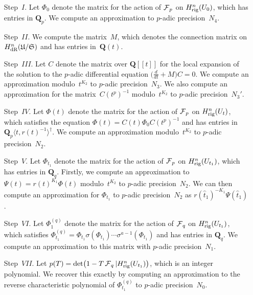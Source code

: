 \begin{enumerate}
\item[Step~$I$.]
Let $\Phi_0$ denote the matrix for the action of $\operatorname{\mathcal{F}}_p$ on 
$H_{\text{rig}}^{n}(U_0)$, which has entries in $\mathbf{Q}_p$.  
We compute an approximation to $p$-adic precision~$N_4$.
\item[Step~$II$.]
We compute the matrix~$M$, which denotes the connection matrix 
on $H_{\text{dR}}^{n}(\mathfrak{U}/\mathfrak{S})$ and has entries in~$\mathbf{Q}(t)$.
\item[Step~$III$.]
Let $C$ denote the matrix over $\mathbf{Q}[[t]]$ for the local 
expansion of the solution to the $p$-adic differential equation 
$\bigl(\tfrac{d}{dt} + M\bigr) C = 0$.  We compute an approximation 
modulo~$t^{K_2}$ to $p$-adic precision~$N_3$.  We also compute an 
approximation for the matrix~$C(t^p)^{-1}$ modulo~$t^{K_2}$ to $p$-adic 
precision~$N_3'$.
\item[Step~$IV$.]
Let $\Phi(t)$ denote the matrix for the action of $\operatorname{\mathcal{F}}_p$ on 
$H_{\text{rig}}^{n}(U_t)$, which satisfies the equation 
$\Phi(t) = C(t) \Phi_0 C(t^p)^{-1}$ and has entries in 
$\mathbf{Q}_p\langle t,r(t)^{-1}\rangle^{\dagger}$.  We compute an 
approximation modulo~$t^{K_2}$ to $p$-adic precision~$N_2$.
\item[Step~$V$.]
Let $\Phi_{t_1}$ denote the matrix for the action of $\operatorname{\mathcal{F}}_p$ 
on $H_{\text{rig}}^{n}(U_{t_1})$, which has entries in $\mathbf{Q}_q$. 
Firstly, we compute an approximation to $\Psi(t) = r(t)^{K_1} \Phi(t)$ 
modulo~$t^{K_2}$ to $p$-adic precision~$N_2$.  We can then compute an 
approximation for $\Phi_{t_1}$ to $p$-adic precision~$N_2$ as 
$r(\hat{t}_1)^{-K_1} \Psi(\hat{t}_1)$.
\item[Step~$VI$.]
Let $\Phi_1^{(q)}$ denote the matrix for the action of $\operatorname{\mathcal{F}}_q$ on 
$H_{\text{rig}}^{n}(U_{t_1})$, which satisfies 
$\Phi_{t_1}^{(q)} = \Phi_{t_1} \sigma(\Phi_{t_1}) \dotsm \sigma^{a-1}(\Phi_{t_1})$ 
and has entries in $\mathbf{Q}_q$.  We compute an approximation to this 
matrix with $p$-adic precision~$N_1$.
\item[Step~$VII$.]
Let $p(T) = \det\bigl(1 - T \operatorname{\mathcal{F}}_q | H_{\text{rig}}^n(U_{t_1})\bigr)$, 
which is an integer polynomial.  We recover this exactly 
by computing an approximation to the reverse characteristic polynomial 
of $\Phi_{t_1}^{(q)}$ to $p$-adic precision~$N_0$.
\end{enumerate}

